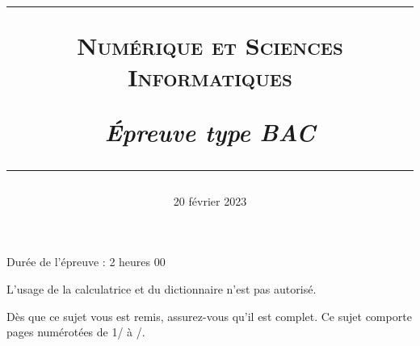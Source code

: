 \documentclass[a4paper, 11pt]{article}
\title{
  \rule{\linewidth}{0.8pt}
  \Large{\scshape{\textbf{Numérique et Sciences Informatiques}}}

  \vspace{0.5cm}
  \large{\textit{Épreuve type BAC}}

  \rule[10pt]{\linewidth}{0.8pt}
    }
\author{}
\date{20 février 2023}
\begin{document}
\maketitle
\thispagestyle{fancy}


\begin{center}
  Durée de l'épreuve : 2 heures 00
\end{center}

\vspace*{1cm}

L'usage de la calculatrice et du dictionnaire n'est pas autorisé.

Dès que ce sujet vous est remis, assurez-vous qu'il est complet.
Ce sujet comporte \pageref{LastPage} pages numérotées de 1/\pageref{LastPage} à \pageref{LastPage}/\pageref{LastPage}.

\vfill
{}

\vspace{0.5cm}


\vfill

\newpage
\end{document}
